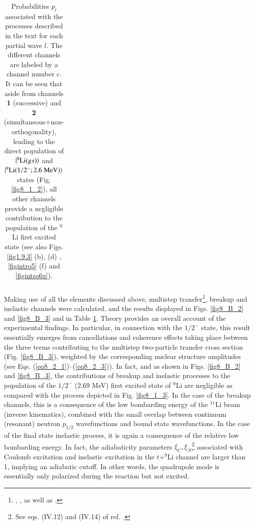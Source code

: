 \begin{table}
\begin{center}
\begin{tabular}{|c|c|c|c|c|c|}
 			\hline
 		\end{tabular}
 		\caption{Probabilities $p_l$  associated with the processes described in the text for each partial wave $l$. The different channels are labeled by a channel number $c$.  It can be seen that aside from channels \textbf{1} (successive) and \textbf{2} (simultaneous+non-orthogonality), leading to the direct population of $|{^9\text{Li}(gs)} \rangle$ and $|{^9\text{Li}(1/2^-;2.6\text{ MeV})} \rangle$ states (Fig. \ref{fig8_1_2}), all other channels provide a negligible contribution to the population of the $^9$Li first excited state (see also Figs. \ref{fig1.9.3} (b), (d) , \ref{figintro5} (f) and \ref{figintro6x}).}\label{tab8_B_1}
 	\end{center}
 \end{table}
 
 
 Making use of all the elements discussed above, multistep transfer\footnote{\cite{Bayman:82}, \cite{Igarashi:91},  \cite{Bayman:73} as well as \cite{Broglia:04a}.}, breakup and inelastic channels were calculated, and the results displayed in Figs. \ref{fig8_B_2} and \ref{fig8_B_3} and in Table \ref{tab8_B_1}. Theory provides an overall account of the experimental findings. In particular, in connection with the $1/2^-$ state, this result essentially emerges from cancellations and coherence effects taking place between the three terms contributing to the multistep two-particle transfer cross section (Fig. \ref{fig8_B_3}), weighted by the corresponding nuclear structure amplitudes  (see Eqs. (\ref{eq8_2_1})--(\ref{eq8_2_3})). In fact, and
 as shown in Figs. \ref{fig8_B_2} and \ref{fig8_B_3}, the contributions of breakup  and inelastic  processes to the population of the $1/2^-$ (2.69 MeV) first excited state of $^9$Li are negligible as compared with the process depicted in Fig. \ref{fig8_1_3}. In the case of the breakup channels, this is a consequence of the low bombarding energy of the $^{11}$Li beam (inverse kinematics), combined with the small overlap between continuum (resonant) neutron $p_{1/2}$ wavefunctions and  bound state wavefunctions. In the case of the final state inelastic process, it is again a consequence of the relative low bombarding energy. In fact, the adiabaticity parameters $\xi_C,\xi_N$\footnote{See eqs. (IV.12) and (IV.14) of ref. \cite{Broglia:04a}.} associated with Coulomb excitation and inelastic excitation in the $t$+$^9$Li channel are larger than 1, implying an adiabatic cutoff. In other words, the quadrupole mode is essentially only polarized during the reaction but not excited. 
 
